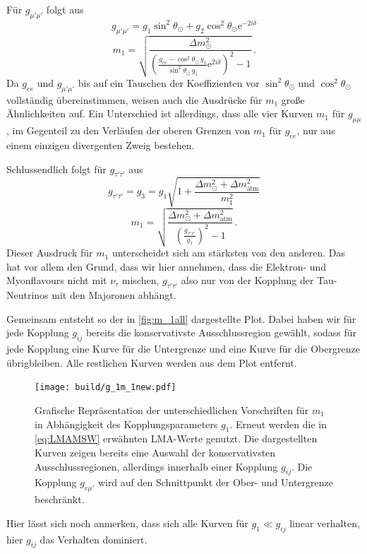 Für $g_{\mu' \mu'}$ folgt aus
\begin{equation*}
    g_{\mu' \mu'} = g_1 \sin^2 \theta_\odot + g_2 \cos^2 \theta_\odot\mathrm{e}^{-2 i \delta}
\end{equation*}
\begin{equation}
    m_1 = \sqrt{\frac{\Delta m^2_\odot}{\left(\frac{g_{ee} -  \cos^2 \theta_\odot \, g_1}{\sin^2 \theta_\odot \, g_1} \mathrm{e}^{2 i \delta} \right)^2 - 1}} \,.
    \label{eq:m_1g_mumu}
\end{equation}
Da $g_{ee}$ und $g_{\mu' \mu'}$ bis auf ein Tauschen der Koeffizienten vor $\sin^2\theta_\odot$ und $\cos^2\theta_\odot$ vollständig übereinstimmen, weisen auch die Ausdrücke für $m_1$ große Ähnlichkeiten auf.
Ein Unterschied ist allerdings, dass alle vier Kurven $m_1$ für $g_{\mu \mu}$, im Gegenteil zu den Verläufen der oberen Grenzen von $m_1$ für $g_{ee}$, nur aus einem einzigen divergenten Zweig bestehen.

Schlussendlich folgt für $g_{\tau' \tau'}$ aus
\begin{equation*}
    g_{\tau' \tau'} = g_3 = g_1 \sqrt{1 + \frac{\Delta m^2_\odot + \Delta m^2_\text{atm}}{m^2_1}}
\end{equation*}
\begin{equation}
    m_1 = \sqrt{\frac{\Delta m^2_\odot + \Delta m^2_\text{atm}}{\left(\frac{g_{\tau' \tau'}}{g_1}\right)^2 - 1}} \,.
    \label{eq:g_tautau}
\end{equation}
Dieser Ausdruck für $m_1$ unterscheidet sich am stärksten von den anderen.
Das hat vor allem den Grund, dass wir hier annehmen, dass die Elektron- und Myonflavours nicht mit $\nu_\tau$ mischen, $g_{\tau' \tau'}$ also nur von der Kopplung der Tau-Neutrinos mit den Majoronen abhängt.

Gemeinsam entsteht so der in \autoref{fig:m_1all} dargestellte Plot.
Dabei haben wir für jede Kopplung $g_{i j}$ bereits die konservativste Ausschlussregion gewählt, sodass für jede Kopplung eine Kurve für die Untergrenze und eine Kurve für die Obergrenze übrigbleiben.
Alle restlichen Kurven werden aus dem Plot entfernt. 
\begin{figure}[H]
    \centering
    \texttt{[image: build/g\_1m\_1new.pdf]}
    \caption{Grafische Repräsentation der unterschiedlichen Vorschriften für $m_1$ in Abhängigkeit des Kopplungsparameters $g_1$. Erneut werden die in \eqref{eq:LMAMSW} erwähnten LMA-Werte genutzt.
            Die dargestellten Kurven zeigen bereits eine Auswahl der konservativsten Ausschlussregionen, allerdings innerhalb einer Kopplung $g_{i j}$. 
            Die Kopplung $g_{e \mu'}$ wird auf den Schnittpunkt der Ober- und Untergrenze beschränkt.}
    \label{fig:m_1all}
\end{figure}
Hier lässt sich noch anmerken, dass sich alle Kurven für $g_1 \ll g_{i j}$ linear verhalten, hier $g_{i j}$ das Verhalten dominiert.

